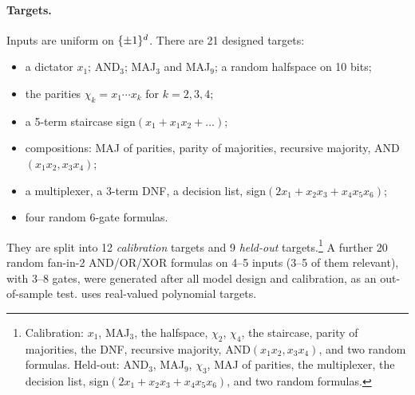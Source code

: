 \paragraph{Targets.} Inputs are uniform on $\{\pm1\}^d$. There are 21 designed targets:
\begin{itemize}
\item a dictator $x_1$; AND$_3$; MAJ$_3$ and MAJ$_9$; a random halfspace on 10 bits;
\item the parities $\chi_k=x_1\cdots x_k$ for $k=2,3,4$;
\item a 5-term staircase sign$(x_1+x_1x_2+\dots)$;
\item compositions: MAJ of parities, parity of majorities, recursive majority, AND$(x_1x_2,x_3x_4)$;
\item a multiplexer, a 3-term DNF, a decision list, sign$(2x_1+x_2x_3+x_4x_5x_6)$;
\item four random 6-gate formulas.
\end{itemize}
They are split into 12 \emph{calibration} targets and 9 \emph{held-out} targets.\footnote{Calibration: $x_1$, MAJ$_3$, the halfspace, $\chi_2$, $\chi_4$, the staircase, parity of majorities, the DNF, recursive majority, AND$(x_1x_2,x_3x_4)$, and two random formulas. Held-out: AND$_3$, MAJ$_9$, $\chi_3$, MAJ of parities, the multiplexer, the decision list, sign$(2x_1+x_2x_3+x_4x_5x_6)$, and two random formulas.} A further 20 random fan-in-2 AND/OR/XOR formulas on 4–5 inputs (3–5 of them relevant), with 3–8 gates, were generated after all model design and calibration, as an out-of-sample test.  uses real-valued polynomial targets.

